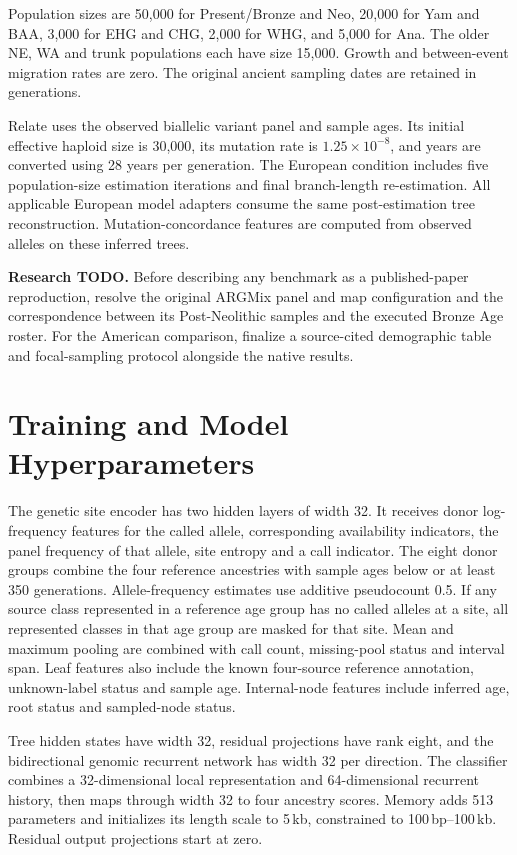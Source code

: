 \documentclass[letterpaper]{article}
\newcommand{\todo}[1]{\par\noindent\textbf{Research TODO.} #1\par}
\begin{document}
Population sizes are 50,000 for Present/Bronze and Neo, 20,000 for Yam and BAA, 3,000 for EHG and CHG, 2,000 for WHG, and 5,000 for Ana. The older NE, WA and trunk populations each have size 15,000. Growth and between-event migration rates are zero. The original ancient sampling dates are retained in generations.

Relate uses the observed biallelic variant panel and sample ages. Its initial effective haploid size is 30,000, its mutation rate is $1.25\times10^{-8}$, and years are converted using 28 years per generation. The European condition includes five population-size estimation iterations and final branch-length re-estimation. All applicable European model adapters consume the same post-estimation tree reconstruction. Mutation-concordance features are computed from observed alleles on these inferred trees.

\todo{Before describing any benchmark as a published-paper reproduction, resolve the original ARGMix panel and map configuration and the correspondence between its Post-Neolithic samples and the executed Bronze Age roster. For the American comparison, finalize a source-cited demographic table and focal-sampling protocol alongside the native results.}

\section{Training and Model Hyperparameters}
\label{app:training}
The genetic site encoder has two hidden layers of width 32. It receives donor log-frequency features for the called allele, corresponding availability indicators, the panel frequency of that allele, site entropy and a call indicator. The eight donor groups combine the four reference ancestries with sample ages below or at least 350 generations. Allele-frequency estimates use additive pseudocount 0.5. If any source class represented in a reference age group has no called alleles at a site, all represented classes in that age group are masked for that site. Mean and maximum pooling are combined with call count, missing-pool status and interval span. Leaf features also include the known four-source reference annotation, unknown-label status and sample age. Internal-node features include inferred age, root status and sampled-node status.

Tree hidden states have width 32, residual projections have rank eight, and the bidirectional genomic recurrent network has width 32 per direction. The classifier combines a 32-dimensional local representation and 64-dimensional recurrent history, then maps through width 32 to four ancestry scores. Memory adds 513 parameters and initializes its length scale to 5\,kb, constrained to 100\,bp--100\,kb. Residual output projections start at zero.
\end{document}
